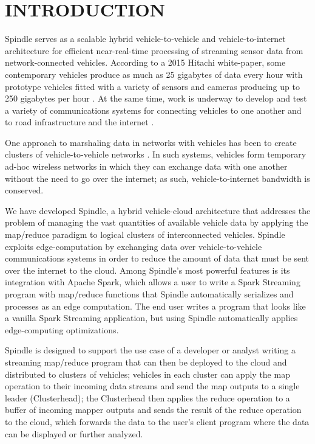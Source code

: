 \documentclass{thesis}
\begin{document}
\chapter{INTRODUCTION}
    Spindle serves as a scalable hybrid vehicle-to-vehicle and vehicle-to-internet architecture
    for efficient near-real-time processing of streaming sensor data from network-connected vehicles.
    According to a 2015 Hitachi white-paper, some contemporary vehicles produce as much
    as 25 gigabytes of data every hour with prototype vehicles fitted with a variety of sensors
    and cameras producing up to 250 gigabytes per hour \cite{hitachi}. At the same time, work is underway
    to develop and test a variety of communications systems for connecting vehicles to one another
    and to road infrastructure and the internet \cite{connectivitypaper}. 

    One approach to marshaling data in networks with vehicles has been to create clusters of
    vehicle-to-vehicle networks \cite{sbca}\cite{cdrive}\cite{clusterselection}\cite{clustering:mobaware}.
    In such systems, vehicles form temporary ad-hoc wireless networks in which they can exchange
    data with one another without the need to go over the internet; as such, vehicle-to-internet
    bandwidth is conserved.
    
    We have developed Spindle, a hybrid vehicle-cloud architecture that addresses the problem of 
    managing the vast quantities of available vehicle data by applying the map/reduce \cite{mapreduce}
    paradigm to logical clusters of interconnected vehicles. Spindle exploits edge-computation
    by exchanging data over vehicle-to-vehicle communications systems in order to reduce the amount of data
    that must be sent over the internet to the cloud. Among Spindle's most powerful features is its
    integration with Apache Spark, which allows a user to write a Spark Streaming program with
    map/reduce functions that Spindle automatically serializes and processes as an edge computation.
    The end user writes a program that looks like a vanilla Spark Streaming application, but using
    Spindle automatically applies edge-computing optimizations.
    
    Spindle is designed to support the use case
    of a developer or analyst writing a streaming map/reduce program that can then be deployed to the cloud
    and distributed to clusters of vehicles; vehicles in each cluster can apply the map operation to their
    incoming data streams and send the map outputs to a single leader (Clusterhead); the Clusterhead then
    applies the reduce operation to a buffer of incoming mapper outputs and sends the result of the reduce
    operation to the cloud, which forwards the data to the user's client program where the data can be
    displayed or further analyzed.
\end{document}
